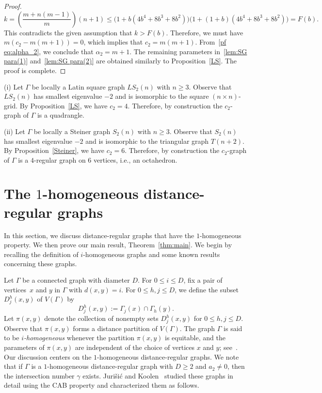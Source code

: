 \begin{proof}
{\small \begin{equation}\label{pf eq(6):pf of SG}
	k = \left(\frac{m+n(m-1)}{m}\right)(n+1)\leqslant \big(1+b(4b^4 + 8b^3 + 8b^2)\big)\big(1+(1+b)(4b^4 + 8b^3 + 8b^2)\big) = F(b).
\end{equation}}This contradicts the given assumption that $k > F(b)$. 
Therefore, we must have \mbox{$m(c_2-m(m+1))=0$}, which implies that $c_2 = m(m+1)$.
From~\eqref{pf eq:alpha_2}, we conclude that $\alpha_2 = m+1$.
The remaining parameters in~\eqref{lem:SG para(1)} and~\eqref{lem:SG para(2)} are obtained similarly to Proposition~\ref{LS}. 
The proof is complete.
\end{proof}


\begin{rema}\label{rmk:Latin, Steiner}
(i) Let $\Gamma$ be locally a Latin square graph $LS_2(n)$ with $n \geqslant 3$.
Observe that $LS_2(n)$ has smallest eigenvalue $-2$ and is isomorphic to the square $(n \times n)$-grid.
By Proposition~\ref{LS}, we have $c_2 = 4$. 
Therefore, by construction the $c_2$-graph of $\Gamma$ is a quadrangle.

(ii) Let $\Gamma$ be locally a Steiner graph $S_2(n)$ with $n \geqslant 3$.
Observe that $S_2(n)$ has smallest eigenvalue $-2$ and is isomorphic to the triangular graph $T(n+2)$.
By Proposition~\ref{Steiner}, we have $c_2 = 6$.
Therefore, by construction the $c_2$-graph of $\Gamma$ is a $4$-regular graph on $6$ vertices, i.e., an octahedron.
\end{rema}

\section{The \texorpdfstring{$1$}{1}-homogeneous distance-regular graphs}\label{sec:1-homoDRGs}
In this section, we discuss distance-regular graphs that have the $1$-homogeneous property. 
We then prove our main result, Theorem~\ref{thm:main}.
We begin by recalling the definition of $i$-homogeneous graphs and some known results concerning these graphs.

Let $\Gamma$ be a connected graph with diameter $D$. 
For $0 \leqslant i \leqslant D$, fix a pair of vertices~$x$ and $y$ in $\Gamma$ with $d(x,y)=i$.
For $0 \leqslant h, j \leqslant D$, we define the subset $D^h_j(x, y)$ of $V(\Gamma)$ by
\begin{equation}
	D^h_j(x,y) := \Gamma_j(x) \cap \Gamma_h(y).
\end{equation}
Let $\pi(x,y)$ denote the collection of nonempty sets $D^h_j(x,y)$ for $0\leqslant h,j \leqslant D$.
Observe that $\pi(x,y)$ forms a distance partition of $V(\Gamma)$.
The graph $\Gamma$ is said to be \emph{$i$-homogeneous} whenever the partition $\pi(x,y)$ is equitable, and the parameters of $\pi(x,y)$ are independent of the choice of vertices $x$ and $y$; see~\cite{Nomura1994}.
Our discussion centers on the $1$-homogeneous distance-regular graphs.
We note that if $\Gamma$ is a $1$-homogeneous distance-regular graph with $D\geqslant 2$ and $a_2\neq 0$, then the intersection number $\gamma$ exists.
Juri\v si\' c and Koolen~\cite{JK2000-1} studied these graphs in detail using the CAB property and characterized them as follows.

